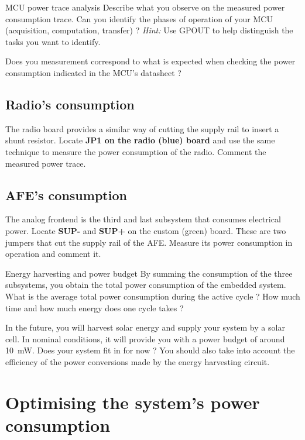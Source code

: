 \begin{bclogo}[couleur = gray!20, arrondi = 0.2, logo=\bcquestion]{MCU power trace analysis}
Describe what you observe on the measured power consumption trace. Can you identify the phases of operation of your MCU (acquisition, computation, transfer) ? \textit{Hint:} Use GPOUT to help distinguish the tasks you want to identify.

Does you measurement correspond to what is expected when checking the power consumption indicated in the MCU's datasheet ?
\end{bclogo}

\subsection{Radio's consumption}

The radio board provides a similar way of cutting the supply rail to insert a shunt resistor. Locate \textbf{JP1 on the radio (blue) board} and use the same technique to measure the power consumption of the radio. Comment the measured power trace.

\subsection{AFE's consumption}

The analog frontend is the third and last subsystem that consumes electrical power. Locate \textbf{SUP-} and \textbf{SUP+} on the custom (green) board. These are two jumpers that cut the supply rail of the AFE. Measure its power consumption in operation and comment it.

\begin{bclogo}[couleur = gray!20, arrondi = 0.2, logo=\bcquestion]{Energy harvesting and power budget}
By summing the consumption of the three subsystems, you obtain the total power consumption of the embedded system. What is the average total power consumption during the active cycle ? How much time and how much energy does one cycle takes ?

In the future, you will harvest solar energy and supply your system by a solar cell. In nominal conditions, it will provide you with a power budget of around \SI{10}{\milli\watt}. Does your system fit in for now ? You should also take into account the efficiency of the power conversions made by the energy harvesting circuit.
\end{bclogo}

\section{Optimising the system's power consumption}

